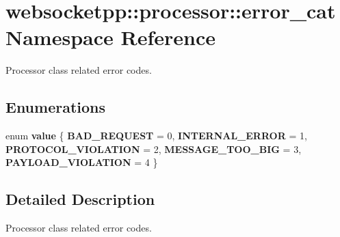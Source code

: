 \hypertarget{namespacewebsocketpp_1_1processor_1_1error__cat}{}\section{websocketpp\+:\+:processor\+:\+:error\+\_\+cat Namespace Reference}
\label{namespacewebsocketpp_1_1processor_1_1error__cat}


Processor class related error codes.  


\subsection*{Enumerations}
\begin{DoxyCompactItemize}
\item 
\mbox{\label{namespacewebsocketpp_1_1processor_1_1error__cat_ae83487c9a0c1462b790898dfcb4b174e}} 
enum {\bfseries value} \{ \newline
{\bfseries B\+A\+D\+\_\+\+R\+E\+Q\+U\+E\+ST} = 0, 
{\bfseries I\+N\+T\+E\+R\+N\+A\+L\+\_\+\+E\+R\+R\+OR} = 1, 
{\bfseries P\+R\+O\+T\+O\+C\+O\+L\+\_\+\+V\+I\+O\+L\+A\+T\+I\+ON} = 2, 
{\bfseries M\+E\+S\+S\+A\+G\+E\+\_\+\+T\+O\+O\+\_\+\+B\+IG} = 3, 
\newline
{\bfseries P\+A\+Y\+L\+O\+A\+D\+\_\+\+V\+I\+O\+L\+A\+T\+I\+ON} = 4
 \}
\end{DoxyCompactItemize}


\subsection{Detailed Description}
Processor class related error codes. 
